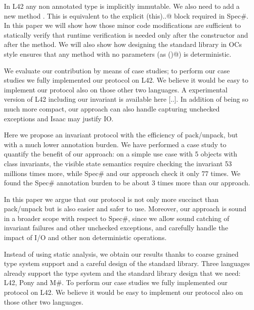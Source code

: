 In L42 any non annotated type is implicitly immutable.
We also need to add a new method \Q@moveTo@. This is equivalent to the explicit \Q@expose(this){..}@
block required in Spec\#.
In this paper we will show how those minor code modifications are sufficient
to statically verify that runtime verification is needed only
after the constructor and after the \Q@moveTo@ method.
We will also show how designing the standard library in OCs style
ensures that any \Q@read@ method with no parameters (as \Q@invariant()@) is
deterministic.

We evaluate our contribution by means of case studies;
to perform our case studies we fully implemented our protocol on L42.
We believe it would be easy to implement our protocol also on those other two languages.
A experimental version of L42 including our invariant is available here [..].
In addition of being so much more compact, our approach can also handle capturing unchecked exceptions
and Isaac may justify IO.


\LINE




Here we propose an invariant protocol with the 
efficiency of pack/unpack, but with a much lower annotation burden.
We have performed a case study to quantify the benefit of our approach:
on a simple use case with 5 objects with class invariants, the visible state semantics 
require checking the invariant 53 millions times more,
while Spec\# and our approach check it only 77 times.
We found the Spec\# annotation burden to be about 3 times more 
than our approach.

In this paper we argue that our protocol is not only more succinct than pack/unpack but is also easier and safer to use.
Moreover, our approach is sound in a broader scope with respect to Spec\#, since we allow sound catching of invariant failures and other unchecked exceptions, and carefully handle
the impact of I/O and other non deterministic operations.

Instead of using static analysis,
we obtain our results thanks to coarse grained type system support and a careful design of the standard library. Three languages already support the type system and the standard library design that we need:
L42, Pony and M\#. To perform our case studies we fully implemented our protocol on L42.
We believe it would be easy to implement our protocol also on those other two languages.

